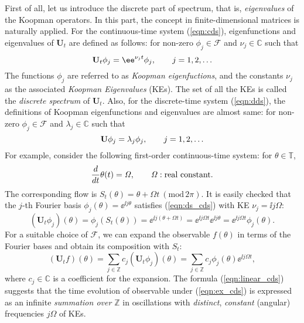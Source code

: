\documentclass[a4paper,10pt]{article}
\def\iO{{\mathit{\Omega}}}
\def\bU{{\mathbf{U}}}
\def\bbZ{{\mathbb{Z}}}
\def\bbC{{\mathbb{C}}}
\def\cF{{\mathcal{F}}}
\begin{document}
%
First of all, let us introduce the discrete part of spectrum, that is, \emph{eigenvalues} of the Koopman operators.   
In this part, the concept in finite-dimensional matrices is naturally applied.  
For the continuous-time system (\ref{eqn:cds}), eigenfunctions and eigenvalues of $\bU_t$ are defined as follows: for non-zero $\phi_j\in\cF$ and $\nu_j\in\bbC$ such that 
\begin{equation}
\bU_t\phi_j=\ee^{\nu_jt}\phi_j,\makebox[2em]{}
j=1,2,\ldots
\label{eqn:ds_cds}
\end{equation}
The functions $\phi_j$ are referred to as \emph{Koopman eigenfuctions}, and the constants $\nu_j$ as the associated \emph{Koopman Eigenvalues} (KEs).  
The set of all the KEs is called the \emph{discrete spectrum} of  $\bU_t$.  
Also, for the discrete-time system (\ref{eqn:dds}), the definitions of Koopman eigenfunctions and eigenvalues are almost same:  for non-zero $\phi_j\in\cF$ and $\lambda_j\in\bbC$ such that 
\[
\bU\phi_j=\lambda_j\phi_j,\makebox[2em]{}
j=1,2,\ldots
\]
For example, consider the following first-order continuous-time system: for $\theta\in\mathbb{T}$,
\begin{equation}
\frac{d}{dt}\theta(t)=\iO,\makebox[2em]{}
\iO:\textrm{real constant}.
\label{eqn:ex_cds}
\end{equation}
The corresponding flow is $S_t(\theta)=\theta+\iO t~(\textrm{mod}\,2\pi)$.  
It is easily checked that the $j$-th Fourier basis $\phi_j(\theta)=\ee^{\ii j\theta}$ satisfies (\ref{eqn:ds_cds}) with KE $\nu_j=\ii j\iO$:
\[
(\bU_t\phi_j)(\theta)
=\phi_j(S_t(\theta))
=\ee^{\ii j(\theta+\iO t)}
=\ee^{\ii j\iO t}\ee^{\ii j\theta}
=\ee^{\ii j\iO t}\phi_j(\theta).
\]
For a suitable choice of $\cF$, we can expand the observable $f(\theta)$ in terms of the Fourier bases and obtain its composition with $S_t$:
\begin{equation}
(\bU_tf)(\theta)
=\sum_{j\in\bbZ}c_j(\bU_t\phi_j)(\theta)
=\sum_{j\in\bbZ}c_j\phi_j(\theta)\ee^{\ii j\iO t},
\label{eqn:linear_cds}
\end{equation}
where $c_j\in\bbC$ is a coefficient for the expansion.  
The formula (\ref{eqn:linear_cds}) suggests that the time evolution of observable under (\ref{eqn:ex_cds}) is expressed as an infinite \emph{summation over $\mathbb{Z}$} in oscillations with \emph{distinct}, \emph{constant} (angular) frequencies $j\iO$ of KEs.
\end{document}
